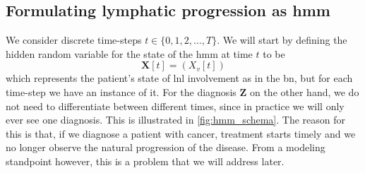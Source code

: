 \documentclass[../ms.tex]{subfiles}
\begin{document}
\subsection{Formulating lymphatic progression as \gls{hmm}}
\label{subsec:hmm_formulation}

We consider discrete time-steps $t \in \{ 0, 1, 2, \ldots, T \}$. We will start by defining the hidden random variable for the state of the \gls{hmm} at time $t$ to be
%
\begin{equation}
    \mathbf{X}[t] = \left( X_v[t] \right)
\end{equation}
%
which represents the patient’s state of \gls{lnl} involvement as in the \gls{bn}, but for each time-step we have an instance of it. For the diagnosis $\mathbf{Z}$ on the other hand, we do not need to differentiate between different times, since in practice we will only ever see one diagnosis. This is illustrated in \cref{fig:hmm_schema}. The reason for this is that, if we diagnose a patient with cancer, treatment starts timely and we no longer observe the natural progression of the disease. From a modeling standpoint however, this is a problem that we will address later.
\end{document}
